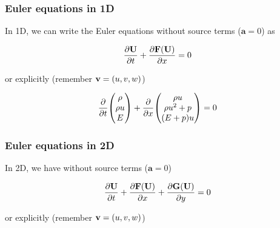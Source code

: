 \subsubsection{Euler equations in 1D}

In 1D, we can write the Euler equations without source terms ($\mathbf{a} = 0$) as 

\begin{align}
    \frac{\partial  \mathbf{U} }{\partial t} + \frac{\partial \mathbf{F}(\mathbf{U})}{\partial x} = 0
\end{align}

or explicitly (remember $\mathbf{v} = (u, v, w)$)


\begin{align}
	\frac{\partial}{\partial t}{ 
		\begin{pmatrix}
			\rho \\ \rho u \\ E
		\end{pmatrix}
		}
	+ \frac{\partial}{\partial x} {
		\begin{pmatrix}
			\rho u\\
			\rho u^2  + p\\
			(E + p) u
		\end{pmatrix}
	} = 0
\end{align}




\subsubsection{Euler equations in 2D}

In 2D, we have without source terms ($\mathbf{a} = 0$)



\begin{align}
    \frac{\partial  \mathbf{U} }{\partial t} + \frac{\partial \mathbf{F}(\mathbf{U})}{\partial x} + \frac{\partial \mathbf{G}(\mathbf{U})}{\partial y} = 0
\end{align}

or explicitly  (remember $\mathbf{v} = (u, v, w)$)

